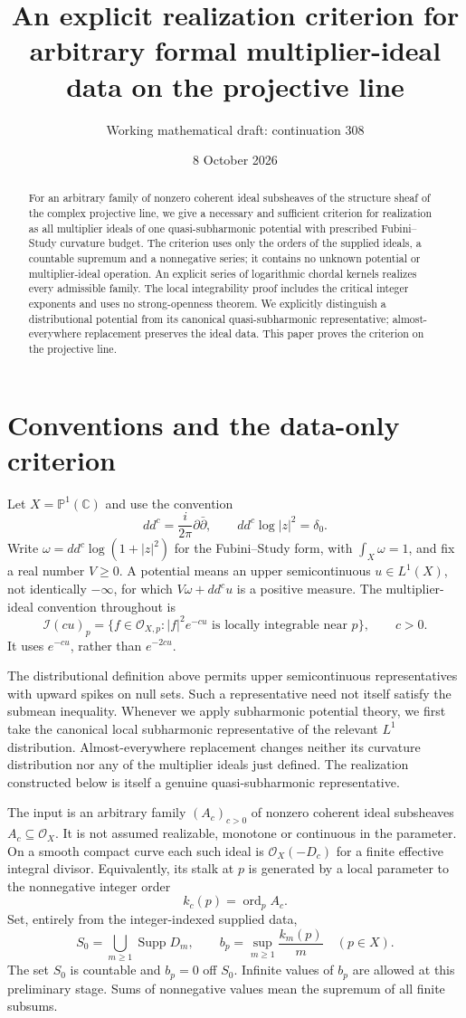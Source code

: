 \documentclass[11pt]{article}
\title{An explicit realization criterion for arbitrary formal multiplier-ideal data on the projective line}
\author{Working mathematical draft: continuation 308}
\date{8 October 2026}
\newcommand{\PP}{\mathbb P}
\newcommand{\OO}{\mathcal O}
\newcommand{\II}{\mathcal I}
\newcommand{\ord}{\operatorname{ord}}
\begin{document}
\maketitle
\begin{abstract}
For an arbitrary family of nonzero coherent ideal subsheaves of the structure sheaf of the complex projective line, we give a necessary and sufficient criterion for realization as all multiplier ideals of one quasi-subharmonic potential with prescribed Fubini--Study curvature budget. The criterion uses only the orders of the supplied ideals, a countable supremum and a nonnegative series; it contains no unknown potential or multiplier-ideal operation. An explicit series of logarithmic chordal kernels realizes every admissible family. The local integrability proof includes the critical integer exponents and uses no strong-openness theorem. We explicitly distinguish a distributional potential from its canonical quasi-subharmonic representative; almost-everywhere replacement preserves the ideal data. This paper proves the criterion on the projective line.
\end{abstract}

\section{Conventions and the data-only criterion}
Let $X=\PP^1(\mathbb C)$ and use the convention
\[
 dd^c=\frac{i}{2\pi}\partial\bar\partial,
 \qquad dd^c\log|z|^2=\delta_0.
\]
Write $\omega=dd^c\log(1+|z|^2)$ for the Fubini--Study form, with $\int_X\omega=1$, and fix a real number $V\geq0$. A potential means an upper semicontinuous $u\in L^1(X)$, not identically $-\infty$, for which $V\omega+dd^cu$ is a positive measure. The multiplier-ideal convention throughout is
\[
 \II(cu)_p=\{f\in\OO_{X,p}: |f|^2e^{-cu}\text{ is locally integrable near }p\},
 \qquad c>0.
\]
It uses $e^{-cu}$, rather than $e^{-2cu}$.

The distributional definition above permits upper semicontinuous representatives with upward spikes on null sets. Such a representative need not itself satisfy the submean inequality. Whenever we apply subharmonic potential theory, we first take the canonical local subharmonic representative of the relevant $L^1$ distribution. Almost-everywhere replacement changes neither its curvature distribution nor any of the multiplier ideals just defined. The realization constructed below is itself a genuine quasi-subharmonic representative.

The input is an arbitrary family $(A_c)_{c>0}$ of nonzero coherent ideal subsheaves $A_c\subseteq\OO_X$. It is not assumed realizable, monotone or continuous in the parameter. On a smooth compact curve each such ideal is $\OO_X(-D_c)$ for a finite effective integral divisor. Equivalently, its stalk at $p$ is generated by a local parameter to the nonnegative integer order
\[
 k_c(p)=\ord_p A_c.
\]
Set, entirely from the integer-indexed supplied data,
\[
 S_0=\bigcup_{m\geq1}\operatorname{Supp}D_m,
 \qquad b_p=\sup_{m\geq1}\frac{k_m(p)}m \quad(p\in X).
\]
The set $S_0$ is countable and $b_p=0$ off $S_0$. Infinite values of $b_p$ are allowed at this preliminary stage. Sums of nonnegative values mean the supremum of all finite subsums.
\end{document}
